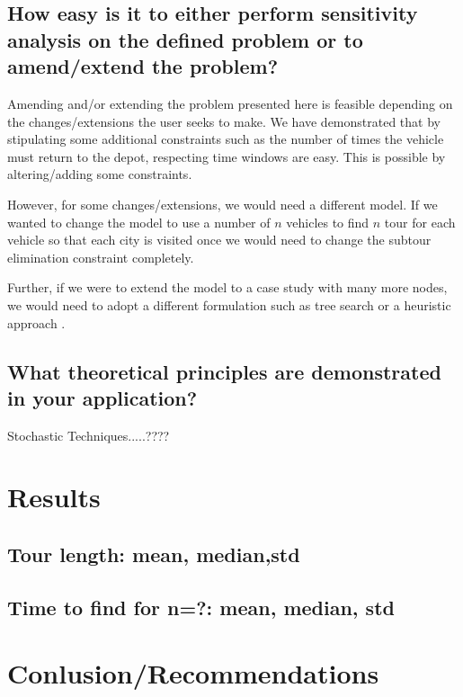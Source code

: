 \documentclass[a4paper,11pt]{article}
\begin{document}
\subsection{How easy is it to either perform sensitivity analysis on the defined problem or to
amend/extend the problem? }

Amending and/or extending the problem presented here is feasible depending on the changes/extensions the user seeks to make. We have demonstrated that by stipulating some additional constraints such as the number of times the vehicle must return to the depot, respecting time windows are easy. This is possible by altering/adding some constraints. 

However, for some changes/extensions, we would need a different model. If we wanted to change the model to use a number of $n$ vehicles to find $n$ tour for each vehicle so that each city is visited once we would need to change the subtour elimination constraint completely. 

Further, if we were to extend the model to a case study with many more nodes, we would need to adopt a different formulation such as tree search or a heuristic approach \cite{gueret1999applications}.

\subsection{What theoretical principles are demonstrated in your application?}



Stochastic Techniques.....????

\section{Results}

\subsection{Tour length: mean, median,std}

\subsection{Time to find for n=?: mean, median, std}

\section{Conlusion/Recommendations}
\end{document}
